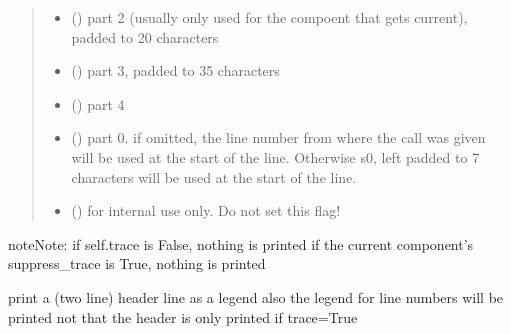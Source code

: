 \documentclass[letterpaper,10pt,english]{sphinxmanual}
\begin{document}
\begin{fulllineitems}
\begin{fulllineitems}
\begin{quote}
\begin{description}
\begin{itemize}
\item {} 
 () \textendash{} part 2 (usually only used for the compoent that gets current), padded to 20 characters

\item {} 
 () \textendash{} part 3, padded to 35 characters

\item {} 
 () \textendash{} part 4

\item {} 
 () \textendash{} part 0. if omitted, the line number from where the call was given will be used at
the start of the line. Otherwise s0, left padded to 7 characters will be used at
the start of the line.

\item {} 
 () \textendash{} for internal use only. Do not set this flag!

\end{itemize}

\end{description}\end{quote}

\begin{sphinxadmonition}{note}{Note:}
if self.trace is False, nothing is printed 
if the current component’s suppress\_trace is True, nothing is printed 
\end{sphinxadmonition}

\end{fulllineitems}


\begin{fulllineitems}
\label{\detokenize{Reference:salabim.Environment.print_trace_header}}
print a (two line) header line as a legend 
also the legend for line numbers will be printed 
not that the header is only printed if trace=True

\end{fulllineitems}


\end{fulllineitems}
\end{document}
